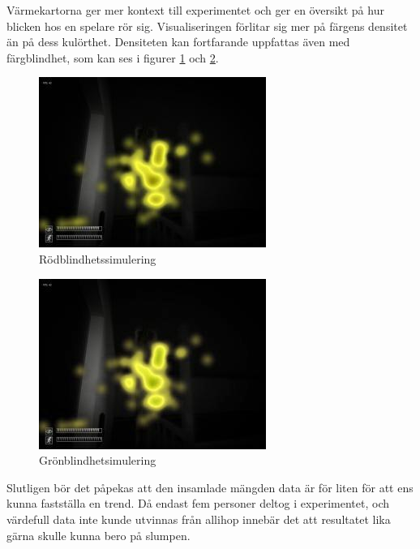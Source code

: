 \documentclass{article}
\begin{document}
Värmekartorna ger mer kontext till experimentet och ger en översikt på hur blicken hos en spelare rör sig. Visualiseringen förlitar sig mer på färgens densitet än på dess kulörthet. Densiteten kan fortfarande uppfattas även med färgblindhet, som kan ses i figurer \ref{heatmap-red-blind} och \ref{heatmap-green-blind}.

\begin{figure}[h!]
    \begin{center}
        \includegraphics*[width=0.50\columnwidth]{experiment/Contact_Heatmap_protanopia.jpg}
        \caption{Rödblindhetssimulering \cite{ColorBlindness}}
        \label{heatmap-red-blind}
    \end{center}
\end{figure}

\begin{figure}[h!]
    \begin{center}
        \includegraphics*[width=0.50\columnwidth]{experiment/Contact_Heatmap_deuteranopia.jpg}
        \caption{Grönblindhetsimulering \cite{ColorBlindness}}
        \label{heatmap-green-blind}
    \end{center}
\end{figure}

Slutligen bör det påpekas att den insamlade mängden data är för liten för att ens kunna fastställa en trend. Då endast fem personer deltog i experimentet, och värdefull data inte kunde utvinnas från allihop innebär det att resultatet lika gärna skulle kunna bero på slumpen.



\end{document}
